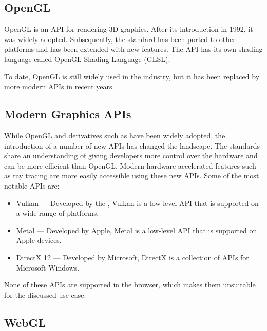 \subsection*{OpenGL}

\gls{OpenGL} is an \gls{API} for rendering 3D graphics. After its introduction in 1992, it was widely adopted. Subsequently, the standard has been ported to other platforms and has been extended with new features. The \gls{API} has its own shading language called OpenGL Shading Language (\gls{GLSL}).

To date, \gls{OpenGL} is still widely used in the industry, but it has been replaced by more modern \glspl{API} in recent years.

\subsection*{Modern Graphics APIs}

While \gls{OpenGL} and derivatives such as  have been widely adopted, the introduction of a number of new \glspl{API} has changed the landscape. The standards share an understanding of giving developers more control over the hardware and can be more efficient than \gls{OpenGL}. Modern hardware-accelerated features such as ray tracing are more easily accessible using these new \glspl{API}. Some of the most notable \glspl{API} are:

\begin{itemize}
  \item{\gls{Vulkan}} — Developed by the , \gls{Vulkan} is a low-level \gls{API} that is supported on a wide range of platforms.
  \item{\gls{Metal}} — Developed by Apple, \gls{Metal} is a low-level \gls{API} that is supported on Apple devices.
  \item{\gls{DirectX 12}} — Developed by Microsoft, DirectX is a collection of \glspl{API} for Microsoft Windows.
\end{itemize}

None of these \glspl{API} are supported in the browser, which makes them unsuitable for the discussed use case.

\subsection*{WebGL}

